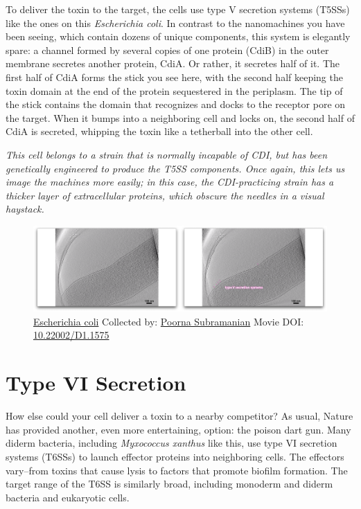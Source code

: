 \documentclass[]{tufte-book}
\begin{document}
To deliver the toxin to the target, the cells use type V secretion
systems (T5SSs) like the ones on this \emph{Escherichia coli}. In
contrast to the nanomachines you have been seeing, which contain dozens
of unique components, this system is elegantly spare: a channel formed
by several copies of one protein (CdiB) in the outer membrane secretes
another protein, CdiA. Or rather, it secretes half of it. The first half
of CdiA forms the stick you see here, with the second half keeping the
toxin domain at the end of the protein sequestered in the periplasm. The
tip of the stick contains the domain that recognizes and docks to the
receptor pore on the target. When it bumps into a neighboring cell and
locks on, the second half of CdiA is secreted, whipping the toxin like a
tetherball into the other cell.

\emph{This cell belongs to a strain that is normally incapable of CDI,
but has been genetically engineered to produce the T5SS components. Once
again, this lets us image the machines more easily; in this case, the
CDI-practicing strain has a thicker layer of extracellular proteins,
which obscure the needles in a visual haystack.}





\begin{figure}
\includegraphics{movie_stills/9_5} \caption[\protect\hyperlink{tree}{Escherichia coli} Collected by:
\protect\hyperlink{poorna_subramanian}{Poorna Subramanian} Movie DOI:
\href{https://doi.org/10.22002/D1.1575}{10.22002/D1.1575}]{\protect\hyperlink{tree}{Escherichia coli} Collected by:
\protect\hyperlink{poorna_subramanian}{Poorna Subramanian} Movie DOI:
\href{https://doi.org/10.22002/D1.1575}{10.22002/D1.1575}}\label{fig:9-5}
\end{figure}

\section{Type VI Secretion}\label{type-vi-secretion}

How else could your cell deliver a toxin to a nearby competitor? As
usual, Nature has provided another, even more entertaining, option: the
poison dart gun. Many diderm bacteria, including \emph{Myxococcus
xanthus} like this, use type VI secretion systems (T6SSs) to launch
effector proteins into neighboring cells. The effectors vary--from
toxins that cause lysis to factors that promote biofilm formation. The
target range of the T6SS is similarly broad, including monoderm and
diderm bacteria and eukaryotic cells.
\end{document}
